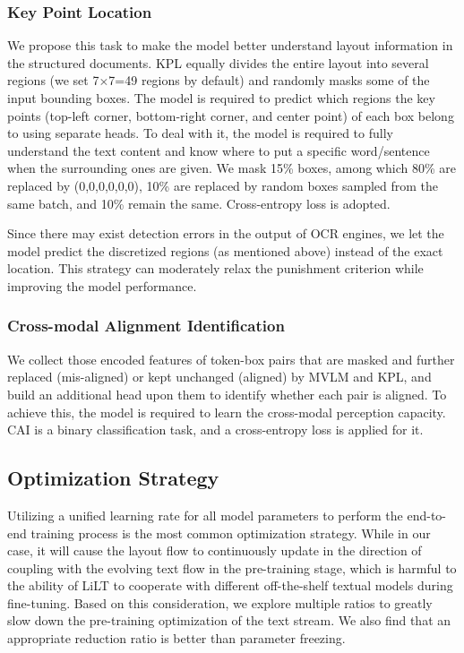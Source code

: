 \documentclass[11pt]{article}
\begin{document}
\subsubsection{Key Point Location}
We propose this  task to make the model better understand  layout information in the structured documents. KPL equally divides the entire layout into several regions (we set 7$\times$7=49 regions by default)  and randomly masks some of the input bounding boxes. The model is required to predict  which  regions the key points (top-left corner, bottom-right corner, and center point) of each box belong to using separate heads.  To deal with it, the model is required to fully understand the text content and know where to put a specific word/sentence when the surrounding ones are given.  We mask 15\% boxes, among which 80\% are replaced by (0,0,0,0,0,0), 10\% are replaced by random boxes sampled from the same batch, and 10\% remain the same. Cross-entropy loss is adopted.

Since there may exist detection errors in the output of OCR engines, we let the model predict the discretized regions (as mentioned above) instead of the exact location. This strategy can moderately relax the punishment criterion while improving the model performance.

\subsubsection{Cross-modal Alignment Identification}
We collect those encoded features of token-box pairs that are masked and further replaced (mis-aligned) or kept unchanged (aligned) by MVLM and KPL, 
and build  an additional head upon them to identify whether each pair is aligned. To achieve this, the model is required to learn the cross-modal perception capacity. CAI is a binary classification task, and  a cross-entropy loss is applied for it.

\subsection{Optimization Strategy}
Utilizing a unified learning rate for all model parameters to perform the end-to-end training process is the most common optimization strategy. While in our case, 
it will cause the layout flow to continuously update in the direction of coupling with the evolving text flow in the pre-training stage, which is harmful to the  ability of LiLT to cooperate with different off-the-shelf  textual models during fine-tuning. Based on this consideration, we explore multiple ratios to greatly slow down  the pre-training optimization of the text stream.
We also find that an appropriate  reduction ratio is better than  parameter freezing.
\end{document}
